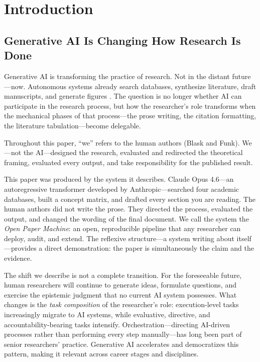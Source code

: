 \documentclass{article}
\begin{document}
\section{Introduction}

\subsection{Generative AI Is Changing How Research Is Done}

Generative AI is transforming the practice of research. Not in the distant future---now. Autonomous systems already search databases, synthesize literature, draft manuscripts, and generate figures \citep{yamada2025scientist,ifargan2024autonomous,asai2024openscholar,zheng2025automation}. The question is no longer whether AI can participate in the research process, but how the researcher's role transforms when the mechanical phases of that process---the prose writing, the citation formatting, the literature tabulation---become delegable.

Throughout this paper, ``we'' refers to the human authors (Blask and Funk). We---not the AI---designed the research, evaluated and redirected the theoretical framing, evaluated every output, and take responsibility for the published result.

This paper was produced by the system it describes. Claude Opus 4.6---an autoregressive transformer developed by Anthropic---searched four academic databases, built a concept matrix, and drafted every section you are reading. The human authors did not write the prose. They directed the process, evaluated the output, and changed the wording of the final document. We call the system the \textit{Open Paper Machine}: an open, reproducible pipeline that any researcher can deploy, audit, and extend. The reflexive structure---a system writing about itself---provides a direct demonstration: the paper is simultaneously the claim and the evidence.

The shift we describe is not a complete transition. For the foreseeable future, human researchers will continue to generate ideas, formulate questions, and exercise the epistemic judgment that no current AI system possesses. What changes is the \textit{task composition} of the researcher's role: execution-level tasks increasingly migrate to AI systems, while evaluative, directive, and accountability-bearing tasks intensify. Orchestration---directing AI-driven processes rather than performing every step manually---has long been part of senior researchers' practice. Generative AI accelerates and democratizes this pattern, making it relevant across career stages and disciplines.
\end{document}
